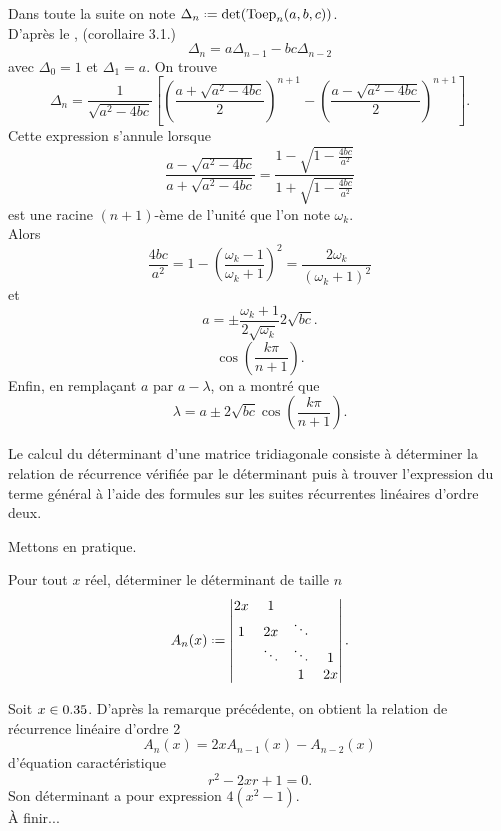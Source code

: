 \begin{preuve}
    Dans toute la suite on note $\Delta_n \defeq \det(\mathrm{Toep}_n(a,b,c))$. \\
    D'après le , (corollaire 3.1.)
    $$\Delta_n = a \Delta_{n-1} - bc \Delta_{n-2}$$
    avec $\Delta_0 = 1$ et $\Delta_1 = a$.
    On trouve 
    $$\Delta_n = \frac{1}{\sqrt{a^2 - 4bc}} \left[ \left( \frac{a + \sqrt{a^2 - 4bc}}{2} \right)^{n+1} - \left( \frac{a - \sqrt{a^2 - 4bc}}{2} \right)^{n+1} \right].$$
    Cette expression s'annule lorsque 
    $$\frac{a - \sqrt{a^2 - 4bc}}{a + \sqrt{a^2 - 4bc}} = \frac{1 - \sqrt{1 - \frac{4bc}{a^2}}}{1 + \sqrt{1 - \frac{4bc}{a^2}}}$$
    est une racine $(n+1)$-ème de l'unité que l'on note $\omega_k$. \\
    Alors
    $$\frac{4bc}{a^2} = 1 - \left( \frac{\omega_k - 1}{\omega_k + 1} \right)^2 = \frac{2 \omega_k}{(\omega_k + 1)^2}$$
    et 
    $$a = \pm \frac{\omega_k + 1}{2 \sqrt{\omega_k}}2 \sqrt{bc}.$$
    $$\cos \left(\frac{k \pi}{n+1}\right).$$
    Enfin, en remplaçant $a$ par $a - \lambda$, on a montré que
    $$\lambda =a \pm 2 \sqrt{bc} \cos \left( \frac{k \pi}{n+1} \right).$$
\end{preuve}

\begin{methode}
    Le calcul du déterminant d'une matrice tridiagonale consiste à déterminer la relation de récurrence vérifiée par le déterminant puis à trouver l'expression du terme général à l'aide des formules sur les suites récurrentes linéaires d'ordre deux. 
\end{methode}

Mettons en pratique.

\begin{exercice}
Pour tout $x$ réel, déterminer le déterminant de taille $n$
    $$
        A_n(x) \defeq \begin{vmatrix}
            2x & 1 & & \\
            1 & 2x & \ddots\\
            & \ddots & \ddots & 1\\
            & & 1 & 2x
        \end{vmatrix}.
    $$   
\end{exercice}

\begin{solution}
    Soit $x \in 0.35$. D'après la remarque précédente, on obtient la relation de récurrence linéaire d'ordre 2
    $$A_n(x) = 2x A_{n-1}(x) - A_{n-2}(x)$$
    d'équation caractéristique 
    $$r^2 - 2xr + 1 = 0.$$
    Son déterminant a pour expression $4(x^2-1)$. \\
    À finir...
\end{solution}
 
